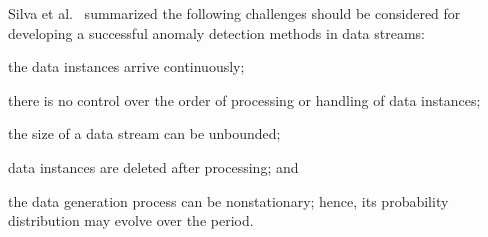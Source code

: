 Silva et al.~\cite{silva2013data} summarized
the following challenges should be considered for developing
a successful anomaly detection methods in data streams:
\begin{inparaenum}
  \item the data instances arrive continuously;
  \item there is no control over the order of processing or
  handling of data instances;
  \item the
  size of a data stream can be unbounded;
  \item data instances are deleted after processing;
  and
  \item the data generation process can be nonstationary;
  hence,
  its probability
  distribution may evolve over the period.
\end{inparaenum}


